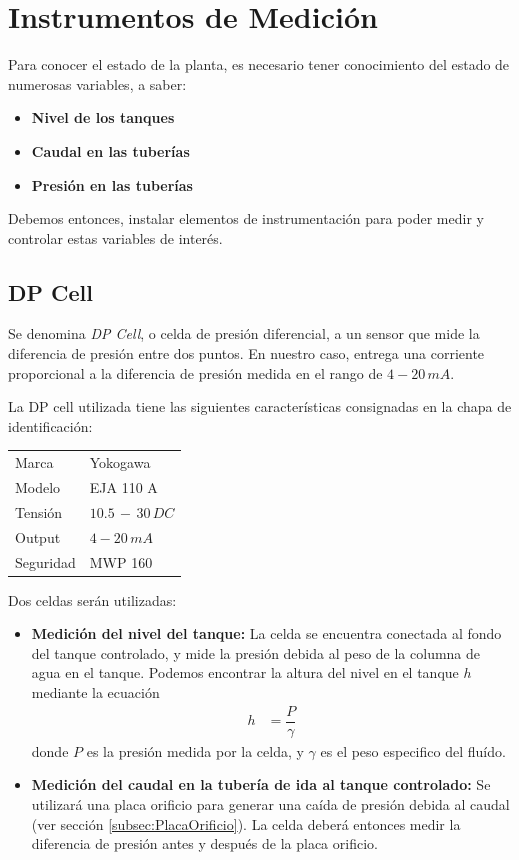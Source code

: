 \section{Instrumentos de Medición}
\label{sec:InstrumentosMedicion}
Para conocer el estado de la planta, es necesario tener conocimiento del
estado de numerosas variables, a saber:
\begin{itemize}
 \item \textbf{Nivel de los tanques}
 \item \textbf{Caudal en las tuberías}
 \item \textbf{Presión en las tuberías}
\end{itemize}
Debemos entonces, instalar elementos de instrumentación para poder 
medir y controlar estas variables de interés.

\subsection{DP Cell}
\label{subsec:DPCell}
Se denomina \textit{DP Cell}, o celda de presión diferencial, a un sensor
que mide la diferencia de presión entre dos puntos.
En nuestro caso, entrega una corriente proporcional a la diferencia de presión 
medida en el rango de $4-20\,mA$.

La DP cell utilizada tiene las siguientes características consignadas en 
la chapa de identificación:

\begin{center}
\begin{tabular}{|l|l|}
\hline
Marca & Yokogawa\\
Modelo & EJA 110 A\\
Tensión & $10.5\,-\,30 \, DC$\\
Output & $4-20\,mA$\\
Seguridad & MWP 160\\
\hline
\end{tabular}
\end{center}

Dos celdas serán utilizadas:
\begin{itemize}
 \item \textbf{Medición del nivel del tanque:} La celda se encuentra conectada
 al fondo del tanque controlado, y mide la presión debida al peso
 de la columna de agua en el tanque. 
 Podemos encontrar la altura del nivel en el tanque $h$ mediante la ecuación
 \begin{align}
  h &= \dfrac{P}{\gamma}
 \end{align}
donde $P$ es la presión medida por la celda, y $\gamma$ es el peso especifico
del fluído.
\item \textbf{Medición del caudal en la tubería de ida al tanque controlado:}
Se utilizará una placa orificio para generar una caída de presión debida al 
caudal (ver sección \ref{subsec:PlacaOrificio}). 
La celda deberá entonces medir la diferencia de presión antes y después
de la placa orificio.
\end{itemize}

